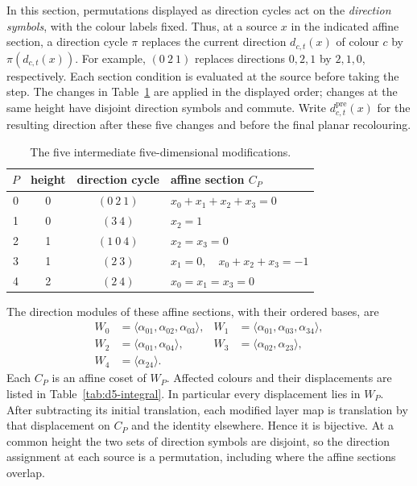 \documentclass[11pt,reqno]{amsart}
\numberwithin{equation}{section}
\theoremstyle{definition}
\theoremstyle{remark}
\begin{document}
In this section, permutations displayed as direction cycles act on
the \emph{direction symbols}, with the colour labels fixed. Thus, at
a source $x$ in the indicated affine section, a direction cycle $\pi$
replaces the current direction $d_{c,t}(x)$ of colour $c$ by
$\pi(d_{c,t}(x))$. For example, $(0\ 2\ 1)$ replaces directions
$0,2,1$ by $2,1,0$, respectively. Each section condition is evaluated
at the source before taking the step. The changes in
Table~\ref{tab:d5-cylinders} are applied in the displayed order;
changes at the same height have disjoint direction symbols and commute.
Write $d^{\mathrm{pre}}_{c,t}(x)$ for the resulting direction after
these five changes and before the final planar recolouring.
\begin{table}[htbp]
\centering\small
\caption{The five intermediate five-dimensional modifications.}\label{tab:d5-cylinders}
\begin{tabular}{cccl}
\toprule
$P$&height&direction cycle&affine section $C_P$\\\midrule
0&0&$(0\ 2\ 1)$&$x_0+x_1+x_2+x_3=0$\\
1&0&$(3\ 4)$&$x_2=1$\\
2&1&$(1\ 0\ 4)$&$x_2=x_3=0$\\
3&1&$(2\ 3)$&$x_1=0,\quad x_0+x_2+x_3=-1$\\
4&2&$(2\ 4)$&$x_0=x_1=x_3=0$\\\bottomrule
\end{tabular}
\end{table}

The direction modules of these affine sections, with their ordered bases, are
\begin{equation}\label{eq:d5-W}
\begin{aligned}
 W_0&=\langle\alpha_{01},\alpha_{02},\alpha_{03}\rangle,&
 W_1&=\langle\alpha_{01},\alpha_{03},\alpha_{34}\rangle,\\
 W_2&=\langle\alpha_{01},\alpha_{04}\rangle,&
 W_3&=\langle\alpha_{02},\alpha_{23}\rangle,\\
 W_4&=\langle\alpha_{24}\rangle.
\end{aligned}
\end{equation}
Each $C_P$ is an affine coset of $W_P$. Affected colours and their displacements
are listed in Table~\ref{tab:d5-integral}. In particular every displacement lies
in $W_P$. After subtracting its initial translation, each modified layer map is
translation by that displacement on $C_P$ and the identity elsewhere. Hence it
is bijective. At a common height the two sets of direction symbols are disjoint, so the
direction assignment at each source is a permutation, including where the
affine sections overlap.
\end{document}
